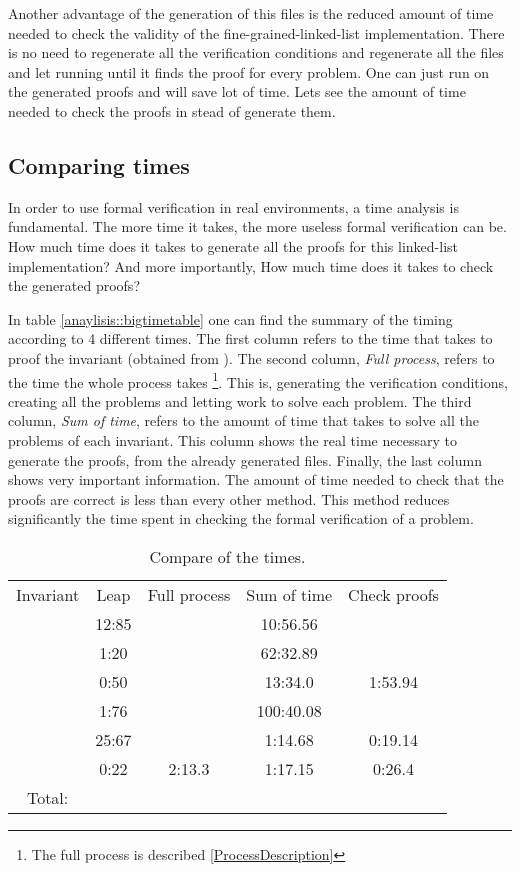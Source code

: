 Another advantage of the generation of this files is the reduced amount of time needed to check the validity of the fine-grained-linked-list implementation. 
%
There is no need to regenerate all the verification conditions and regenerate all the \spass files and let \spass running until it finds the proof for every problem. 
%
One can just run \spass on the generated proofs and will save lot of time.
%
Lets see the amount of time needed to check the proofs in stead of generate them.


\subsection{Comparing times}

In order to use formal verification in real environments, a time analysis is fundamental. 
%
The more time it takes, the more useless formal verification can be.
%
How much time does it takes to generate all the proofs for this linked-list implementation? 
%
And more importantly,  How much time does it takes to check the generated proofs? 

In table \ref{anaylisis::bigtimetable} one can find the summary of the timing according to 4 different times. The first column refers to the time that \leap takes to proof the invariant (obtained from \cite{paperParametrizedInvariants}). 
%
The second column, \textit{Full process}, refers to the time the whole process takes \footnote{The full process is described  \ref{ProcessDescription}}. 
%
This is, generating the verification conditions, creating all the \spass problems and letting \spass work to solve each problem.
%
The third column, \textit{Sum of \spass time}, refers to the amount of time that \spass takes to solve all the problems of each invariant.
%
This column shows the real time necessary to generate the proofs, from the already generated files.
%
Finally, the last column shows very important information.
%
The amount of time needed to check that the proofs are correct is less than every other method. 
%
This method reduces significantly the time spent in checking the formal verification of a problem.


\begin{table}[hbtp]
\centering
\begin{tabular}{c|cccc}
Invariant 		& Leap 	& Full process 		& Sum of \spass time 	& Check proofs 	\\
\invPreserve 	& 12:85	&					& 10:56.56				&		\\
\invOrder		& 1:20	&					& 62:32.89				&  		\\
\invLock		& 0:50	& 					& 13:34.0  				& 1:53.94		\\
\invNext 		& 1:76	&					& 100:40.08				& 		\\
\invRegion		& 25:67	& 					& 1:14.68				& 0:19.14		\\
\invDisj 		& 0:22 	& 2:13.3 			& 1:17.15 				& 0:26.4		\\
Total: 			& 		& 					& 						&  				\\
\end{tabular}
\caption{Compare of the times.}
\label{anaylsis:bigtimetable}
\end{table}


